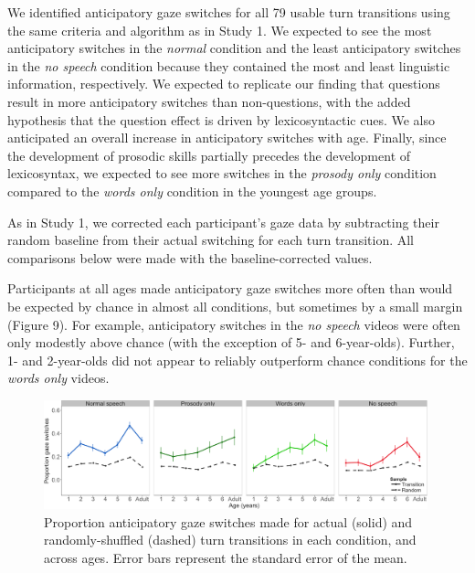 \documentclass[authoryear, 12pt]{elsarticle}
\begin{document}
We identified anticipatory gaze switches for all 79 usable turn transitions using the same criteria and algorithm as in Study 1. We expected to see the most anticipatory switches in the \textit{normal} condition and the least anticipatory switches in the \textit{no speech} condition because they contained the most and least linguistic information, respectively. We expected to replicate our finding that questions result in more anticipatory switches than non-questions, with the added hypothesis that the question effect is driven by lexicosyntactic cues. We also anticipated an overall increase in anticipatory switches with age. Finally, since the development of prosodic skills partially precedes the development of lexicosyntax, we expected to see more switches in the \textit{prosody only} condition compared to the \textit{words only} condition in the youngest age groups.

As in Study 1, we corrected each participant's gaze data by subtracting their random baseline from their actual switching for each turn transition. All comparisons below were made with the baseline-corrected values.

Participants at all ages made anticipatory gaze switches more often than would be expected by chance in almost all conditions, but sometimes by a small margin (Figure 9). For example, anticipatory switches in the \textit{no speech} videos were often only modestly above chance (with the exception of 5- and 6-year-olds). Further, 1- and 2-year-olds did not appear to reliably outperform chance conditions for the \textit{words only} videos.

\begin{figure}[ht]
\begin{center}
\includegraphics[width=0.99\textwidth]{figures/FIG-randvsreal-EN.png}
\end{center}
\caption{Proportion anticipatory gaze switches made for actual (solid) and randomly-shuffled (dashed) turn transitions in each condition, and across ages. Error bars represent the standard error of the mean.} 
\label{randvsrealEN}
\end{figure}
\end{document}
